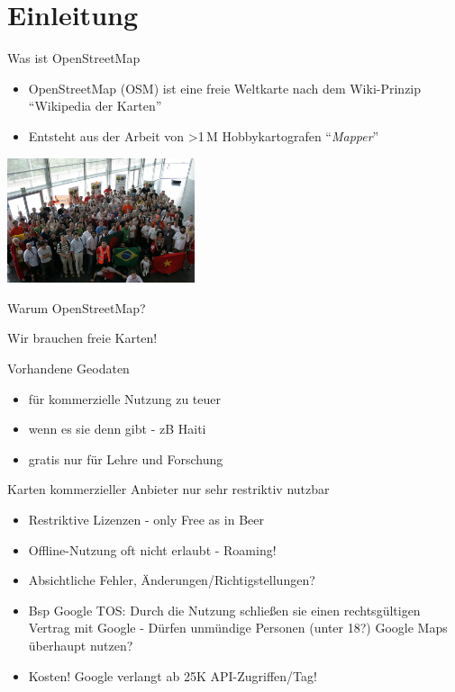 \documentclass{beamer}
\begin{document}
\section{Einleitung}

\begin{frame}{Was ist OpenStreetMap}

\begin{itemize}
  \item OpenStreetMap (OSM) ist eine freie Weltkarte nach dem Wiki-Prinzip ``Wikipedia der Karten''
\pause
  \item Entsteht aus der Arbeit von \textgreater 1\,M Hobbykartografen ``\emph{Mapper}''
\end{itemize}

 \begin{center}
 \includegraphics[width=5.5cm]{sotm.jpg}
 \end{center}

\end{frame}


\begin{frame}{Warum OpenStreetMap?}

Wir brauchen freie Karten!

\pause
\vspace{2mm}
Vorhandene Geodaten 
\begin{itemize}
  \item	für kommerzielle Nutzung zu teuer
  \item	wenn es sie denn gibt - zB Haiti
  \item	gratis nur für Lehre und Forschung
\end{itemize}

\pause
\vspace{2mm}
Karten kommerzieller Anbieter nur sehr restriktiv nutzbar
\begin{itemize}
  \item Restriktive Lizenzen - only Free as in Beer
  \item Offline-Nutzung oft nicht erlaubt - Roaming!
  \item Absichtliche Fehler, Änderungen/Richtigstellungen?
  \pause
  \item Bsp Google TOS: Durch die Nutzung schließen sie einen rechtsgültigen Vertrag mit Google - Dürfen unmündige Personen (unter 18?) Google Maps überhaupt nutzen?
  \item Kosten! Google verlangt ab 25K API-Zugriffen/Tag!
\end{itemize}

\end{frame}
\end{document}

